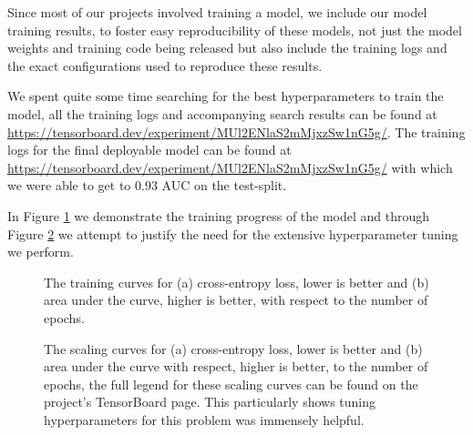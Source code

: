 \documentclass[fontsize=11pt]{article}
\begin{document}
Since most of our projects involved training a model, we include our model training results, to foster easy reproducibility of these models, not just the model weights and training code being released but also include the training logs and the exact configurations used to reproduce these results.

We spent quite some time searching for the best hyperparameters to train the model, all the training logs and accompanying search results can be found at \url{https://tensorboard.dev/experiment/MUl2ENlaS2mMjxzSw1nG5g/}. The training logs for the final deployable model can be found at \url{https://tensorboard.dev/experiment/MUl2ENlaS2mMjxzSw1nG5g/} with which we were able to get to $0.93$ AUC on the test-split.

In Figure \ref{fig:training_logs} we demonstrate the training progress of the model and through Figure \ref{fig:scaling_logs} we attempt to justify the need for the extensive hyperparameter tuning we perform.

\begin{figure}[htbp]
  \centering
  \begin{minipage}{0.45\textwidth}
    \centering
    
    \subcaption{}
    \label{fig:sub_a}
  \end{minipage}\hfill
  \begin{minipage}{0.45\textwidth}
    \centering
    
    \subcaption{}
    \label{fig:sub_b}
  \end{minipage}
  \caption{The training curves for (a) cross-entropy loss, lower is better and (b) area under the curve, higher is better, with respect to the number of epochs.}
  \label{fig:training_logs}
\end{figure}

\begin{figure}[htbp]
  \centering
  \begin{minipage}{0.45\textwidth}
    \centering
    
    \subcaption{}
    \label{fig:sub_a}
  \end{minipage}\hfill
  \begin{minipage}{0.45\textwidth}
    \centering
    
    \subcaption{}
    \label{fig:sub_b}
  \end{minipage}
  \caption{The scaling curves for (a) cross-entropy loss, lower is better and (b) area under the curve with respect, higher is better, to the number of epochs, the full legend for these scaling curves can be found on the project's TensorBoard page. This particularly shows tuning hyperparameters for this problem was immensely helpful.}
  \label{fig:scaling_logs}
\end{figure}
\end{document}

